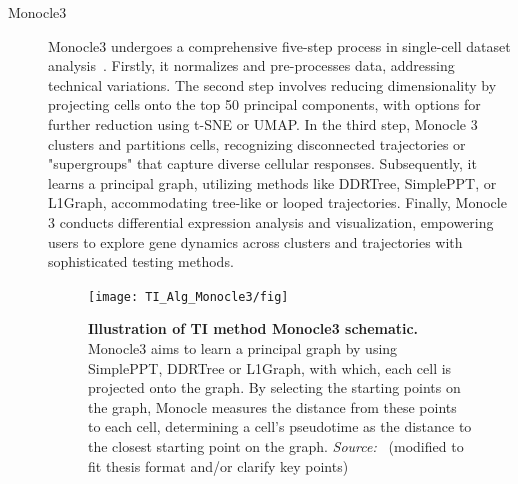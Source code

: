\begin{description}
  \item[Monocle3]
  Monocle3 undergoes a comprehensive five-step process in single-cell dataset analysis~\citep{cao2019monocle3}. Firstly, it normalizes and pre-processes data, addressing technical variations. The second step involves reducing dimensionality by projecting cells onto the top 50 principal components, with options for further reduction using t-SNE or UMAP. In the third step, Monocle 3 clusters and partitions cells, recognizing disconnected trajectories or "supergroups" that capture diverse cellular responses. Subsequently, it learns a principal graph, utilizing methods like DDRTree, SimplePPT, or L1Graph, accommodating tree-like or looped trajectories. Finally, Monocle 3 conducts differential expression analysis and visualization, empowering users to explore gene dynamics across clusters and trajectories with sophisticated testing methods.
  \begin{figure}[ht!]
  	\centering
  	\texttt{[image: TI\_Alg\_Monocle3/fig]}
  	\vspace{0.1cm}
  	\caption[Illustration of TI method Monocle3 schematic.]{\textbf{Illustration of TI method Monocle3 schematic.} Monocle3 aims to learn a principal graph by using SimplePPT, DDRTree or L1Graph, with which, each cell is projected onto the graph. By selecting the starting points on the graph, Monocle measures the distance from these points to each cell, determining a cell's pseudotime as the distance to the closest starting point on the graph. \emph{Source:~\cite{cao2019monocle3}} (modified to fit thesis format and/or clarify key points)
  	}
  	\label{fig:TI_Alg_Monocle3}
  \end{figure}


\end{description}
